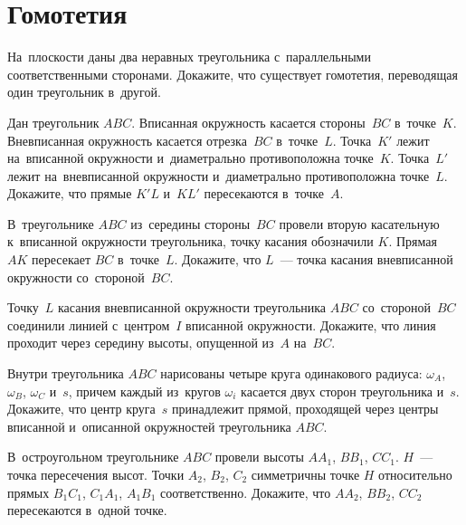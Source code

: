 
\section*{Гомотетия}


\begin{problems}

\item
На~плоскости даны два неравных треугольника с~параллельными соответственными
сторонами.
Докажите, что существует гомотетия, переводящая один треугольник в~другой.

\item
Дан треугольник $ABC$.
Вписанная окружность касается стороны~$BC$ в~точке~$K$.
Вневписанная окружность касается отрезка~$BC$ в~точке~$L$.
Точка~$K'$ лежит на~вписанной окружности и~диаметрально противоположна
точке~$K$.
Точка~$L'$ лежит на~вневписанной окружности и~диаметрально противоположна
точке~$L$.
Докажите, что прямые $K'L$ и~$KL'$ пересекаются в~точке~$A$.

\item
В~треугольнике $ABC$ из~середины стороны~$BC$ провели вторую касательную
к~вписанной окружности треугольника, точку касания обозначили $K$.
Прямая~$AK$ пересекает $BC$ в~точке~$L$.
Докажите, что $L$~--- точка касания вневписанной окружности со~стороной~$BC$.

\item
Точку~$L$ касания вневписанной окружности треугольника $ABC$ со~стороной~$BC$
соединили линией с~центром~$I$ вписанной окружности.
Докажите, что линия проходит через середину высоты, опущенной из~$A$ на~$BC$.

\item
Внутри треугольника $ABC$ нарисованы четыре круга одинакового радиуса:
$\omega_A$, $\omega_B$, $\omega_C$ и~$s$, причем каждый из~кругов $\omega_i$
касается двух сторон треугольника и~$s$.
Докажите, что центр круга~$s$ принадлежит прямой, проходящей через центры
вписанной и~описанной окружностей треугольника $ABC$.

\item
В~остроугольном треугольнике $ABC$ провели высоты $A A_1$, $B B_1$, $C C_1$.
$H$~--- точка пересечения высот.
Точки $A_2$, $B_2$, $C_2$ симметричны точке $H$ относительно прямых
$B_1 C_1$, $C_1 A_1$, $A_1 B_1$ соответственно.
Докажите, что $A A_2$, $B B_2$, $C C_2$ пересекаются в~одной точке.


\end{problems}
